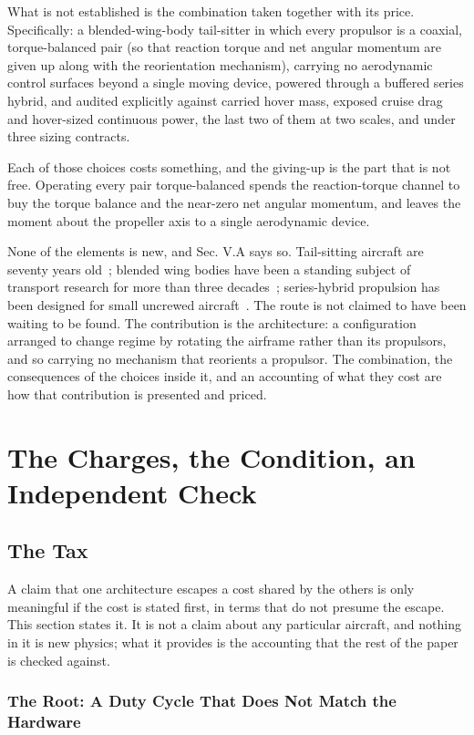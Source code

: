 \documentclass[journal]{new-aiaa}
\begin{document}
What is not established is the combination taken together with its price. Specifically: a blended-wing-body tail-sitter in which every propulsor is a coaxial, torque-balanced pair (so that reaction torque and net angular momentum are given up along with the reorientation mechanism), carrying no aerodynamic control surfaces beyond a single moving device, powered through a buffered series hybrid, and audited explicitly against carried hover mass, exposed cruise drag and hover-sized continuous power, the last two of them at two scales, and under three sizing contracts.

Each of those choices costs something, and the giving-up is the part that is not free. Operating every pair torque-balanced spends the reaction-torque channel to buy the torque balance and the near-zero net angular momentum, and leaves the moment about the propeller axis to a single aerodynamic device.

None of the elements is new, and Sec. V.A says so. Tail-sitting aircraft are seventy years old~\cite{r1}; blended wing bodies have been a standing subject of transport research for more than three decades~\cite{r12}; series-hybrid propulsion has been designed for small uncrewed aircraft~\cite{r13}. The route is not claimed to have been waiting to be found. The contribution is the architecture: a configuration arranged to change regime by rotating the airframe rather than its propulsors, and so carrying no mechanism that reorients a propulsor. The combination, the consequences of the choices inside it, and an accounting of what they cost are how that contribution is presented and priced.

\section{The Charges, the Condition, an Independent Check}

\subsection{The Tax}

A claim that one architecture escapes a cost shared by the others is only meaningful if the cost is stated first, in terms that do not presume the escape. This section states it. It is not a claim about any particular aircraft, and nothing in it is new physics; what it provides is the accounting that the rest of the paper is checked against.

\subsubsection{The Root: A Duty Cycle That Does Not Match the Hardware}
\end{document}
